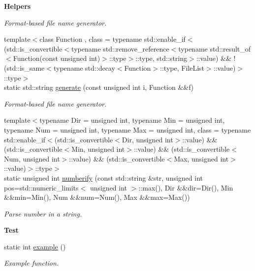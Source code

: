 \begin{Indent}{\bf Helpers}
\begin{DoxyCompactItemize}
\begin{DoxyCompactList}\small\item\em Format-\/based file name generator. \end{DoxyCompactList}\item 
{\footnotesize template$<$class Function , class  = typename std\-::enable\-\_\-if$<$(std\-::is\-\_\-convertible$<$typename std\-::remove\-\_\-reference$<$typename std\-::result\-\_\-of$<$\-Function(const unsigned int)$>$\-::type$>$\-::type, std\-::string$>$\-::value) \&\& !(std\-::is\-\_\-same$<$typename std\-::decay$<$\-Function$>$\-::type, File\-List$>$\-::value)$>$\-::type$>$ }\\static std\-::string \hyperlink{exceptionmagrathea_1_1FileList_a7ad27d1f6e7dd0703419de9afc5629d2}{generate} (const unsigned int i, Function \&\&f)
\begin{DoxyCompactList}\small\item\em Format-\/based file name generator. \end{DoxyCompactList}\item 
{\footnotesize template$<$typename Dir  = unsigned int, typename Min  = unsigned int, typename Num  = unsigned int, typename Max  = unsigned int, class  = typename std\-::enable\-\_\-if$<$(std\-::is\-\_\-convertible$<$\-Dir, unsigned int$>$\-::value) \&\& (std\-::is\-\_\-convertible$<$\-Min, unsigned int$>$\-::value) \&\& (std\-::is\-\_\-convertible$<$\-Num, unsigned int$>$\-::value) \&\& (std\-::is\-\_\-convertible$<$\-Max, unsigned int$>$\-::value)$>$\-::type$>$ }\\static unsigned int \hyperlink{exceptionmagrathea_1_1FileList_a7b586f219889272fa2c4d2d66316145f}{numberify} (const std\-::string \&str, unsigned int pos=std\-::numeric\-\_\-limits$<$ unsigned int $>$\-::max(), Dir \&\&dir=Dir(), Min \&\&min=Min(), Num \&\&num=Num(), Max \&\&max=Max())
\begin{DoxyCompactList}\small\item\em Parse number in a string. \end{DoxyCompactList}\end{DoxyCompactItemize}
\end{Indent}
\begin{Indent}{\bf Test}\par
\begin{DoxyCompactItemize}
\item 
static int \hyperlink{exceptionmagrathea_1_1FileList_a60d6b038b7affeb0e430e4b9aa2d4959}{example} ()
\begin{DoxyCompactList}\small\item\em Example function. \end{DoxyCompactList}\end{DoxyCompactItemize}
\end{Indent}
